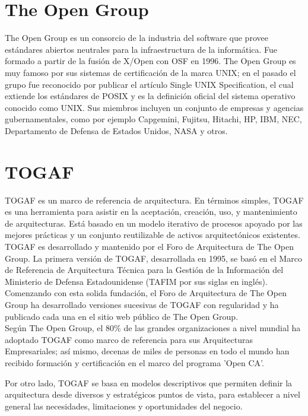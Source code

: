 \section{The Open Group}
The Open Group es un consorcio de la industria del software que provee estándares abiertos neutrales para la infraestructura de la informática. Fue formado a partir de la fusión de X/Open con OSF en 1996. The Open Group es muy famoso por sus sistemas de certificación de la marca UNIX; en el pasado el grupo fue reconocido por publicar el artículo Single UNIX Specification, el cual extiende los estándares de POSIX y es la definición oficial del sistema operativo conocido como UNIX. Sus miembros incluyen un conjunto de empresas y agencias gubernamentales, como por ejemplo Capgemini, Fujitsu, Hitachi, HP, IBM, NEC, Departamento de Defensa de Estados Unidos, NASA y otros.

\section{TOGAF}
TOGAF es un marco de referencia de arquitectura. En términos simples, TOGAF es una herramienta para asistir en la aceptación, creación, uso, y mantenimiento de arquitecturas. Está basado en un modelo iterativo de procesos apoyado por las mejores prácticas y un conjunto reutilizable de activos arquitectónicos existentes. \\

TOGAF es desarrollado y mantenido por el Foro de Arquitectura de The Open Group. La primera versión de TOGAF, desarrollada en 1995, se basó en el Marco de Referencia de Arquitectura Técnica para la Gestión de la Información del Ministerio de Defensa Estadounidense (TAFIM por sus siglas en inglés). Comenzando con esta solida fundación, el Foro de Arquitectura de The Open Group ha desarrollado versiones sucesivas de TOGAF con regularidad y ha publicado cada una en el sitio web público de The Open Group. \\

Según The Open Group, el 80\% de las grandes organizaciones a nivel mundial ha adoptado TOGAF como marco de referencia para sus Arquitecturas Empresariales; así mismo, decenas de miles de personas en todo el mundo han recibido formación y certificación en el marco del programa 'Open CA'.

Por otro lado, TOGAF se basa en modelos descriptivos que permiten definir la arquitectura desde diversos y estratégicos puntos de vista, para establecer a nivel general las necesidades, limitaciones y oportunidades del negocio.

